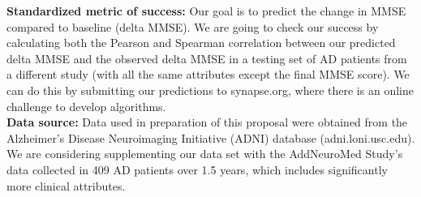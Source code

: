 \documentclass[a4paper]{article}
\begin{document}
\newline
\noindent 
\textbf{Standardized metric of success:} Our goal is to predict the change in MMSE compared to baseline (delta MMSE). We are going to check our success by calculating both the Pearson and Spearman correlation between our predicted delta MMSE and the observed delta MMSE in a testing set of AD patients from a different study (with all the same attributes except the final MMSE score). We can do this by submitting our predictions to synapse.org, where there is an online challenge to develop algorithms.\\
\newline
\noindent 
\textbf{Data source:} Data used in preparation of this proposal were obtained from the Alzheimer's Disease Neuroimaging Initiative (ADNI) database (adni.loni.usc.edu). We are considering supplementing our data set with the AddNeuroMed Study’s data collected in 409 AD patients over 1.5 years, which includes significantly more clinical attributes.

\end{document}
